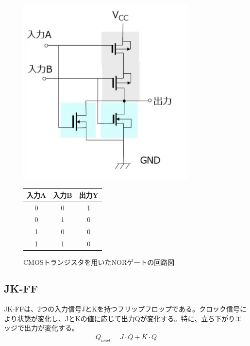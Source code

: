 \documentclass{jlreq}
\numberwithin{equation}{section}
\begin{document}
\begin{figure}[H]
  \centering
  \begin{minipage}{0.45\textwidth}
    \centering
    \includegraphics[width=0.8\textwidth]{assets/nor.png}
    \caption{CMOSトランジスタを用いたNORゲートの回路図}
    \label{fig:nor_gate}
  \end{minipage}
  \hfill
  \begin{minipage}{0.45\textwidth}
    \centering
    \label{tab:nor_truth_table}
    \begin{tabular}{|c|c|c|}
      \hline
      入力A & 入力B & 出力Y \\ \hline
      0     & 0     & 1     \\ \hline
      0     & 1     & 0     \\ \hline
      1     & 0     & 0     \\ \hline
      1     & 1     & 0     \\ \hline
    \end{tabular}
  \end{minipage}
\end{figure}

\subsection{JK-FF}
JK-FFは、2つの入力信号JとKを持つフリップフロップである。クロック信号により状態が変化し、JとKの値に応じて出力Qが変化する。特に、立ち下がりエッジで出力が変化する。
\begin{equation}
  Q_{next} = J \cdot \overline{Q} + \overline{K} \cdot Q
\end{equation}
\end{document}
